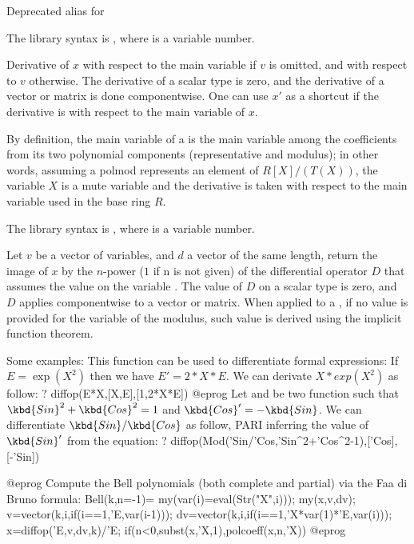 \label{se:bezoutres}
Deprecated alias for 

The library syntax is , where  is a variable number.

\label{se:deriv}
Derivative of $x$ with respect to the main
variable if $v$ is omitted, and with respect to $v$ otherwise. The derivative
of a scalar type is zero, and the derivative of a vector or matrix is done
componentwise. One can use $x'$ as a shortcut if the derivative is with
respect to the main variable of $x$.

By definition, the main variable of a  is the main variable among
the coefficients from its two polynomial components (representative and
modulus); in other words, assuming a polmod represents an element of
$R[X]/(T(X))$, the variable $X$ is a mute variable and the derivative is
taken with respect to the main variable used in the base ring $R$.

The library syntax is , where  is a variable number.

\label{se:diffop}
Let $v$ be a vector of variables, and $d$ a vector of the same length,
return the image of $x$ by the $n$-power ($1$ if n is not given) of the differential
operator $D$ that assumes the value  on the variable .
The value of $D$ on a scalar type is zero, and $D$ applies componentwise to a vector
or matrix. When applied to a , if no value is provided for the variable
of the modulus, such value is derived using the implicit function theorem.

Some examples:
This function can be used to differentiate formal expressions:
If $E=\exp(X^2)$ then we have $E'=2*X*E$. We can derivate $X*exp(X^2)$ as follow:
\bprog
? diffop(E*X,[X,E],[1,2*X*E])
@eprog
Let  and  be two function such that $\kbd{Sin}^2+\kbd{Cos}^2=1$
and $\kbd{Cos}'=-\kbd{Sin}$. We can differentiate $\kbd{Sin}/\kbd{Cos}$ as follow,
PARI inferring the value of $\kbd{Sin}'$ from the equation:
\bprog
? diffop(Mod('Sin/'Cos,'Sin^2+'Cos^2-1),['Cos],[-'Sin])

@eprog
Compute the Bell polynomials (both complete and partial) via the Faa di Bruno formula:
\bprog
Bell(k,n=-1)=
{
  my(var(i)=eval(Str("X",i)));
  my(x,v,dv);
  v=vector(k,i,if(i==1,'E,var(i-1)));
  dv=vector(k,i,if(i==1,'X*var(1)*'E,var(i)));
  x=diffop('E,v,dv,k)/'E;
  if(n<0,subst(x,'X,1),polcoeff(x,n,'X))
}
@eprog

